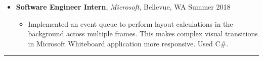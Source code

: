 \documentclass[10.5pt,letterpaper]{article}
\begin{document}
\begin{itemize}
    \item[]
    {\textbf{Software Engineer Intern}, \textit{Microsoft}, Bellevue, WA \hfill {Summer 2018}}
    \begin{itemize}[label=\textbullet]
      \itemsep0.1em
      \item Implemented an event queue to perform layout calculations in the background 
      across multiple frames. This makes complex visual transitions in Microsoft Whiteboard application
      more responsive. Used C\#.
    \end{itemize}


  \end{itemize}
  
\hrule
\vspace{-0.95em}
\end{document}
